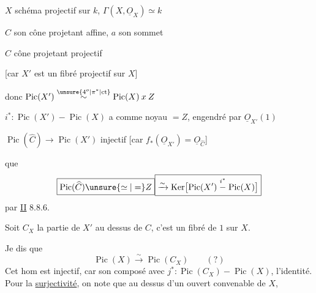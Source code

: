 $X$ schéma projectif sur $k$, \qquad $\Gamma(X,\underline O_X)\simeq k$

$C$ son cône projetant affine, $a$ son sommet

$\widehat C$  cône projetant projectif


[car $X'$ est un fibré projectif sur $X$]

donc $\operatorname{Pic}(X')\mathrel{\overset{\unsure{4^o|\pi^*|\mathrm{ct}}}{\sim}}\operatorname{Pic}(X)\mathbin{x}Z$

$i^*\colon\operatorname{Pic}(X')\mathrel{-}\operatorname{Pic}(X)$ a comme noyau $=Z$, engendré par $\underline O_{X'}(1)$

$\operatorname{Pic}(\widehat C)\longrightarrow\operatorname{Pic}(X')$ injectif
[car $f_*(\underline O_{X'})=\underline O_{\widehat C}$]

 que
\[
\boxed{\operatorname{Pic}(\widehat C)\unsure{\simeq|=}Z}
\boxed{\xrightarrow{\sim}\operatorname{Ker}\bigl[\operatorname{Pic}(X')\mathrel{\overset{i^*}{-}}\operatorname{Pic}(X)\bigr]}
\]
\hfill par \uline{II} 8.8.6.

Soit $C_X$ la partie de $X'$ au dessus de $C$, c'est un fibré  de  $1$ sur $X$.

Je dis que
\[
\operatorname{Pic}(X)\xrightarrow{\sim}\operatorname{Pic}(C_X)\qquad (?)
\]
Cet hom est  injectif, car son composé avec $j^*\colon\operatorname{Pic}(C_X)\mathrel{-}\operatorname{Pic}(X)$,    l'identité. Pour la \uline{surjectivité}, on note que au dessus d'un ouvert convenable de $X$,

